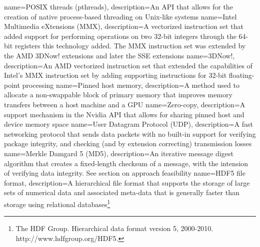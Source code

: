  {
  name={POSIX threads (pthreads)},
  description={An API that allows for the creation of native process-based threading on Unix-like systems}
 }
 {
  name={Intel Multimedia eXtensions (MMX)},
  description={A vectorized instruction set that added support for performing operations on two 32-bit integers through the 64-bit registers this technology added.
  The MMX instruction set was extended by the AMD 3DNow! extensions and later the SSE extensions}
 }
 {
  name={3DNow!},
  description={An AMD vectorized instruction set that extended the capabilities of Intel's MMX instruction set by adding supporting instructions for 32-bit floating-point 
  processing}
 }
 {
  name={Pinned host memory},
  description={A method used to allocate a non-swappable block of primary memory that improves memory transfers between a host machine and a GPU}
 }
 {
  name={Zero-copy},
  description={A support mechanism in the Nvidia API that allows for sharing pinned host and device memory space}
 } 
 {
  name={User Datagram Protocol (UDP)},
  description={A fast networking protocol that sends data packets with no built-in support for verifying package integrity, and checking (and by extension correcting) 
  transmission losses}
 }
 {
  name={Merkle Damgard 5 (MD5)},
  description={An iterative message digest algorithm that creates a fixed-length checksum of a message, with the intension of verifying data integrity. See section
  on approach feasibility}
 }
 {
  name={HDF5 file format},
  description={A hierarchical file format that supports the storage of large sets of numerical data and associated meta-data that is generally faster than
  storage using relational databases\footnote{The HDF Group. Hierarchical data format version 5, 2000-2010. http://www.hdfgroup.org/HDF5.}}
 }